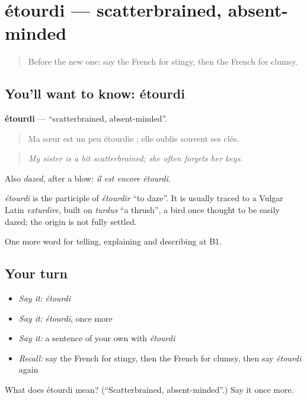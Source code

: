 \section[étourdi]{étourdi — scatterbrained, absent-minded}

\label{lesson:FR-C467-etourdi}



\begin{quote}
Before the new one: say the French for stingy, then the French for clumsy.
\end{quote}

\subsection*{You'll want to know: étourdi}
\textbf{étourdi} — \textquotedblleft{}scatterbrained, absent-minded\textquotedblright{}.

\begin{quote}
Ma sœur est un peu étourdie ; elle oublie souvent ses clés.
\end{quote}

\begin{quote}
\emph{My sister is a bit scatterbrained; she often forgets her keys.}
\end{quote}

Also \emph{dazed}, after a blow: \emph{il est encore étourdi}.

\begin{cousinweb}
\emph{étourdi} is the participle of \emph{étourdir} \textquotedblleft{}to daze\textquotedblright{}. It is usually traced to a Vulgar Latin \emph{exturdīre}, built on \emph{turdus} \textquotedblleft{}a thrush\textquotedblright{}, a bird once thought to be easily dazed; the origin is not fully settled.
\end{cousinweb}

\begin{grammarlens}[title={What you've built}]
One more word for telling, explaining and describing at B1.
\end{grammarlens}

\subsection*{Your turn}
\begin{itemize}
\raggedright
  \item \emph{Say it:} \emph{étourdi}
  \item \emph{Say it:} \emph{étourdi}, once more
  \item \emph{Say it:} a sentence of your own with \emph{étourdi}
  \item \emph{Recall:} say the French for stingy, then the French for clumsy, then say \emph{étourdi} again
\end{itemize}

\begin{tcolorbox}[breakable,colback=teal!4,colframe=teal!35!black,title={Before you move on}]
What does étourdi mean? (\textquotedblleft{}Scatterbrained, absent-minded\textquotedblright{}.) Say it once more.
\end{tcolorbox}
